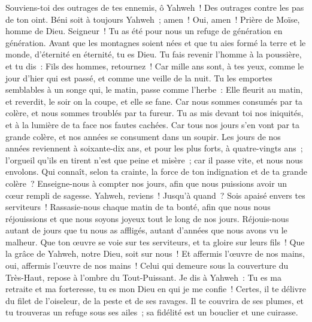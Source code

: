 \begin{multicols}{2}
Souviens-toi des outrages de tes ennemis, ô Yahweh~! Des outrages contre les pas de ton oint.
Béni soit à toujours Yahweh~; amen~! Oui, amen~!
\VerseOne{}Prière de Moïse, homme de Dieu. Seigneur~! Tu as été pour nous un refuge de génération en génération.
Avant que les montagnes soient nées et que tu aies formé la terre et le monde, d'éternité en éternité, tu es Dieu.
Tu fais revenir l'homme à la poussière, et tu dis~: Fils des hommes, retournez~!
Car mille ans sont, à tes yeux, comme le jour d'hier qui est passé, et comme une veille de la nuit.
Tu les emportes semblables à un songe qui, le matin, passe comme l'herbe~:
Elle fleurit au matin, et reverdit, le soir on la coupe, et elle se fane.
Car nous sommes consumés par ta colère, et nous sommes troublés par ta fureur.
Tu as mis devant toi nos iniquités, et à la lumière de ta face nos fautes cachées.
Car tous nos jours s'en vont par ta grande colère, et nos années se consument dans un soupir.
Les jours de nos années reviennent à soixante-dix ans, et pour les plus forts, à quatre-vingts ans~; l'orgueil qu'ils en tirent n'est que peine et misère~; car il passe vite, et nous nous envolons.
Qui connaît, selon ta crainte, la force de ton indignation et de ta grande colère~?
Enseigne-nous à compter nos jours, afin que nous puissions avoir un cœur rempli de sagesse.
Yahweh, reviens~! Jusqu'à quand~? Sois apaisé envers tes serviteurs~!
Rassasie-nous chaque matin de ta bonté, afin que nous nous réjouissions et que nous soyons joyeux tout le long de nos jours.
Réjouis-nous autant de jours que tu nous as affligés, autant d'années que nous avons vu le malheur.
Que ton œuvre se voie sur tes serviteurs, et ta gloire sur leurs fils~!
Que la grâce de Yahweh, notre Dieu, soit sur nous~! Et affermis l'œuvre de nos mains, oui, affermis l'œuvre de nos mains~!
\VerseOne{}Celui qui demeure sous la couverture du Très-Haut, repose à l'ombre du Tout-Puissant.
Je dis à Yahweh~: Tu es ma retraite et ma forteresse, tu es mon Dieu en qui je me confie~!
Certes, il te délivre du filet de l'oiseleur, de la peste et de ses ravages.
Il te couvrira de ses plumes, et tu trouveras un refuge sous ses ailes~; sa fidélité est un bouclier et une cuirasse.

\end{multicols}

